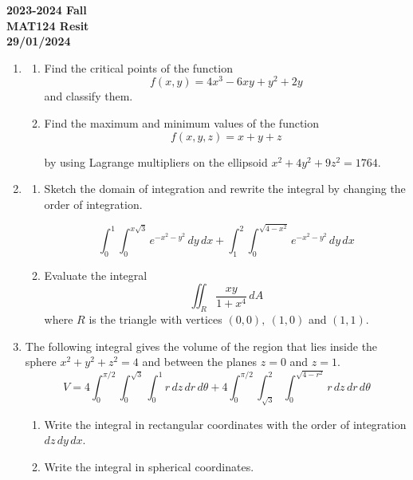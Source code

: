 \documentclass[a4paper, 12pt]{article}
\begin{document}
\pagestyle{empty}

\begin{center}
\textbf{2023-2024 Fall \\MAT124 Resit\\29/01/2024}
\end{center}

\begin{enumerate}[leftmargin=*,label=\textbf{\arabic*.}]
\item \begin{enumerate}[leftmargin=*,label=\textbf{\alph*.}]
\item Find the critical points of the function
\[f(x,y)=4x^3-6xy+y^2+2y\]
and classify them.

\item Find the maximum and minimum values of the function
\[f(x,y,z)=x+y+z\]

by using Lagrange multipliers on the ellipsoid $x^2+4y^2+9z^2=1764$.
\end{enumerate}

\item \begin{enumerate}[leftmargin=*,label=\textbf{\alph*.}]
\item Sketch the domain of integration and rewrite the integral by changing the order of integration.

\[\int_0^1\int_0^{x\sqrt3}{e}^{-x^2-y^2}\,dy\,dx+\int_1^2\int_0^{\sqrt{4-x^2}}{e}^{-x^2-y^2}\,dy\,dx\]

\item Evaluate the integral
\[\iint_R\frac{xy}{1+x^4}\,dA\]
where $R$ is the triangle with vertices $(0,0),\:(1,0)$ and $(1,1)$.

\end{enumerate}

\item The following integral gives the volume of the region that lies inside the sphere $x^2+y^2+z^2=4$ and between the planes $z=0$ and $z=1$.
\[V=4\int_0^{\pi/2}\int_0^{\sqrt3}\int_0^1r\,dz\,dr\,d\theta+4\int_0^{\pi/2}\int_{\sqrt3}^2\int_0^{\sqrt{4-r^2}}r\,dz\,dr\,d\theta\]

\begin{enumerate}[leftmargin=*,label=\textbf{\alph*.}]
\item Write the integral in rectangular coordinates with the order of integration $dz\,dy\,dx$.

\item Write the integral in spherical coordinates.
\end{enumerate}


\end{enumerate}
\end{document}
